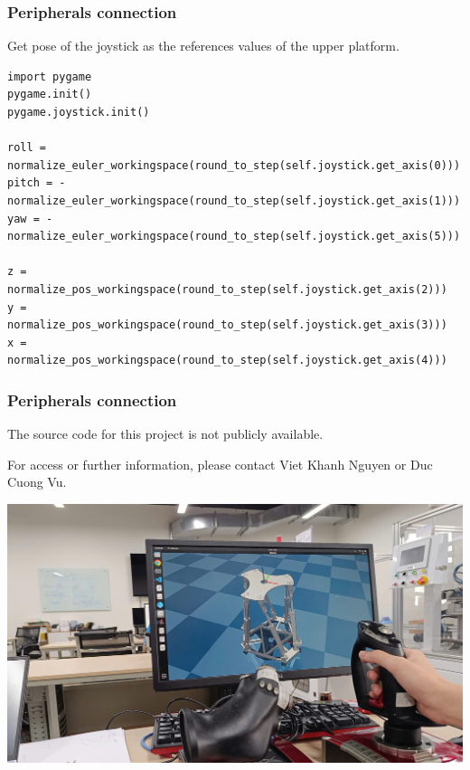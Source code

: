\documentclass[9pt]{beamer}
\begin{document}
		
			\begin{frame}[fragile]
				\frametitle{Peripherals connection}
			
			Get pose of the joystick as the references values of the upper platform.
				\begin{verbatim}
import pygame
pygame.init()
pygame.joystick.init()

roll = normalize_euler_workingspace(round_to_step(self.joystick.get_axis(0)))
pitch = -normalize_euler_workingspace(round_to_step(self.joystick.get_axis(1)))
yaw = -normalize_euler_workingspace(round_to_step(self.joystick.get_axis(5)))
	
z = normalize_pos_workingspace(round_to_step(self.joystick.get_axis(2)))
y = normalize_pos_workingspace(round_to_step(self.joystick.get_axis(3)))
x = normalize_pos_workingspace(round_to_step(self.joystick.get_axis(4)))			
				\end{verbatim}
				\scalebox{0.6}{}
			\end{frame}
		
					\begin{frame}[fragile]
			\frametitle{Peripherals connection}
			The source code for this project is not publicly available.
			
			For access or further information, please contact Viet Khanh Nguyen or Duc Cuong Vu.
				\begin{center}
					\includegraphics[width=1\linewidth]{images/real-joystick-ctrl}
				\end{center}
				
			\end{frame}
		
\end{document}
